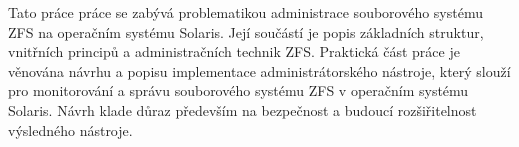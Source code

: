 Tato práce práce se zabývá problematikou administrace souborového systému ZFS na operačním systému Solaris. Její součástí je popis základních struktur, vnitřních principů a administračních technik ZFS.
Praktická část práce je věnována návrhu a popisu implementace administrátorského nástroje, který slouží pro monitorování a správu souborového systému ZFS v operačním systému Solaris. Návrh klade důraz především na bezpečnost a budoucí rozšiřitelnost výsledného nástroje. 